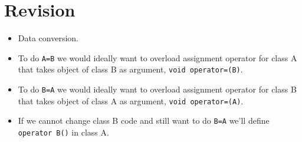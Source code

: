 \documentclass[12pt,a4paper]{article}
\begin{document}
\section{Revision}
\begin{itemize}
\item Data conversion.
\item To do \verb|A=B| we would ideally want to overload assignment operator for class A that takes object of class B as argument, \verb|void operator=(B)|.
\item To do \verb|B=A| we would ideally want to overload assignment operator for class B that takes object of class A as argument, \verb|void operator=(A)|.
\item If we cannot change class B code and still want to do \verb|B=A| we'll define \verb|operator B()| in class A.
\end{itemize}
\end{document}
